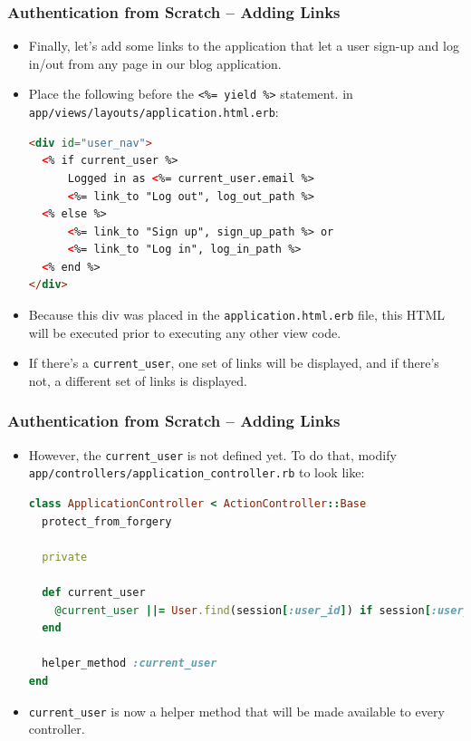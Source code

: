 \documentclass[t,handout]{beamer}
\begin{document}
\begin{frame}[fragile]\frametitle{Authentication from Scratch -- Adding Links}
{\small
\begin{itemize}
\item Finally, let's add some links to the application that let a user sign-up and log in/out from any page in our blog application.
\pause
\item Place the following before the {\tt <\%= yield \%>} statement. in  {\tt app/views/layouts/application.html.erb}:
\begin{lstlisting}[frame=none,language=HTML,basicstyle=\scriptsize\ttfamily\color{black}]
<div id="user_nav">
  <% if current_user %>
      Logged in as <%= current_user.email %>
      <%= link_to "Log out", log_out_path %> 
  <% else %>
      <%= link_to "Sign up", sign_up_path %> or
      <%= link_to "Log in", log_in_path %> 
  <% end %>
</div>
\end{lstlisting}
\item Because this div was placed in the {\tt application.html.erb} file, this HTML will be executed prior to executing any other view code.
\pause
\item If there's a {\tt current\_user}, one set of links will be displayed, and if there's not, a different set of links is displayed.
 \end{itemize}}
\end{frame}  

\begin{frame}[fragile]\frametitle{Authentication from Scratch -- Adding Links}
\begin{itemize}
\item However, the {\tt current\_user} is not defined yet.  To do that,  modify  {\tt app/controllers/application\_controller.rb} to look like:
\begin{lstlisting}[frame=none,language=Ruby,basicstyle=\scriptsize\ttfamily\color{black}]
class ApplicationController < ActionController::Base
  protect_from_forgery
  
  private
  
  def current_user
    @current_user ||= User.find(session[:user_id]) if session[:user_id]
  end
  
  helper_method :current_user
end
\end{lstlisting}
  \pause
    \item {\tt current\_user} is now a helper method that will be made available to every controller.
  \end{itemize}
\end{frame}  
\end{document}
